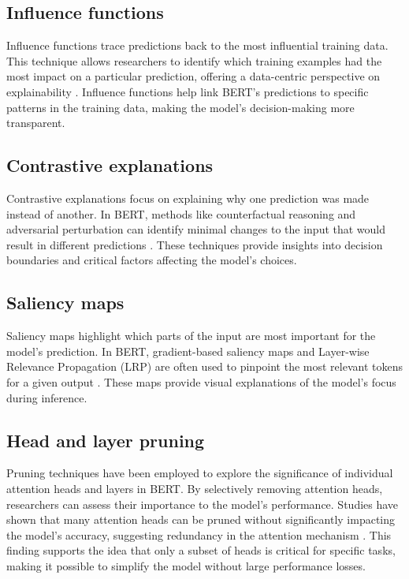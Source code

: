 \documentclass[11pt,a4paper,reqno]{amsart} %
\theoremstyle{definition}
\numberwithin{equation}{section}          %
\begin{document}
\subsection{Influence functions}
Influence functions trace predictions back to the most influential training data. This technique allows researchers to identify which training examples had the most impact on a particular prediction, offering a data-centric perspective on explainability \cite{koh2017}. Influence functions help link BERT’s predictions to specific patterns in the training data, making the model's decision-making more transparent.

\subsection{Contrastive explanations}
Contrastive explanations focus on explaining why one prediction was made instead of another. In BERT, methods like counterfactual reasoning and adversarial perturbation can identify minimal changes to the input that would result in different predictions \cite{goyal2019}. These techniques provide insights into decision boundaries and critical factors affecting the model’s choices.

\subsection{Saliency maps}
Saliency maps highlight which parts of the input are most important for the model's prediction. In BERT, gradient-based saliency maps and Layer-wise Relevance Propagation (LRP) are often used to pinpoint the most relevant tokens for a given output \cite{sundararajan2017}. These maps provide visual explanations of the model’s focus during inference.

\subsection{Head and layer pruning}
Pruning techniques have been employed to explore the significance of individual attention heads and layers in BERT. By selectively removing attention heads, researchers can assess their importance to the model's performance. Studies have shown that many attention heads can be pruned without significantly impacting the model’s accuracy, suggesting redundancy in the attention mechanism \cite{voita2019}. This finding supports the idea that only a subset of heads is critical for specific tasks, making it possible to simplify the model without large performance losses.
\end{document}
